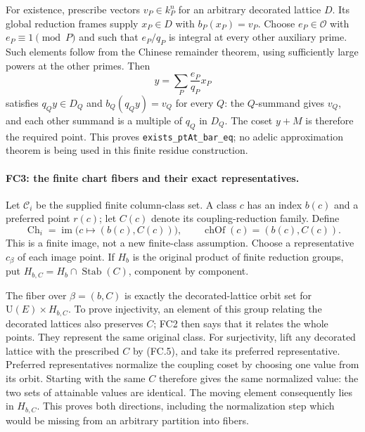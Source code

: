 For existence, prescribe vectors $v_P\in k_P^n$ for an arbitrary
decorated lattice $D$. Its global reduction frames supply
$x_P\in D$ with $b_P(x_P)=v_P$. Choose $e_P\in\mathcal O$ with
$e_P\equiv1\pmod P$ and such that $e_P/q_P$ is integral at every
other auxiliary prime. Such elements follow from the Chinese remainder
theorem, using sufficiently large powers at the other primes. Then
\[
 y=\sum_P\frac{e_P}{q_P}x_P                            \tag{FC.5}
\]
satisfies $q_Qy\in D_Q$ and $b_Q(q_Qy)=v_Q$ for every $Q$:
the $Q$-summand gives $v_Q$, and each other summand is a multiple of
$q_Q$ in $D_Q$. The coset $y+M$ is therefore the required point.
This proves \texttt{exists\_ptAt\_bar\_eq}; no adelic approximation
theorem is being used in this finite residue construction.

\paragraph{FC3: the finite chart fibers and their exact representatives.}
Let $\mathscr C_i$ be the supplied finite column-class set. A class
$c$ has an index $b(c)$ and a preferred point $r(c)$; let
$C(c)$ denote its coupling-reduction family. Define
\[
 \operatorname{Ch}_i=\operatorname{im}
       \bigl(c\mapsto(b(c),C(c))\bigr),\qquad
 \operatorname{chOf}(c)=(b(c),C(c)).                     \tag{FC.6}
\]
This is a finite image, not a new finite-class assumption. Choose a
representative $c_\beta$ of each image point. If $H_b$ is the original
product of finite reduction groups, put
$H_{b,C}=H_b\cap\operatorname{Stab}(C)$, component by component.

The fiber over $\beta=(b,C)$ is exactly the decorated-lattice orbit
set for $\mathrm U(E)\times H_{b,C}$. To prove injectivity, an element
of this group relating the decorated lattices also preserves $C$;
FC2 then says that it relates the whole points. They represent the same
original class. For surjectivity, lift any decorated lattice with the
prescribed $C$ by (FC.5), and take its preferred representative. Preferred
representatives normalize the coupling coset by choosing one value from
its orbit. Starting with the same $C$ therefore gives the same normalized
value: the two sets of attainable values are identical. The moving
element consequently lies in $H_{b,C}$. This proves both directions,
including the normalization step which would be missing from an arbitrary
partition into fibers.

